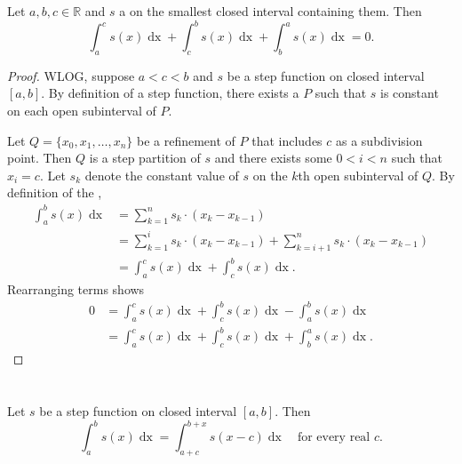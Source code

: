 \documentclass{report}
\begin{document}
\begin{theorem}[1.6]

  Let $a, b, c \in \mathbb{R}$ and $s$ a  on the
    smallest closed interval containing them.
  Then
    $$\int_a^c s(x) \mathop{dx} + \int_c^b s(x) \mathop{dx} +
      \int_b^a s(x) \mathop{dx} = 0.$$

\end{theorem}

\begin{proof}

  WLOG, suppose $a < c < b$ and $s$ be a step function on closed interval
    $[a, b]$.
  By definition of a step function, there exists a 
    $P$ such that $s$ is constant on each open subinterval of $P$.

  Let $Q = \{x_0, x_1, \ldots, x_n\}$ be a refinement of $P$ that includes $c$
    as a subdivision point.
  Then $Q$ is a step partition of $s$ and there exists some $0 < i < n$ such
    that $x_i = c$.
  Let $s_k$ denote the constant value of $s$ on the $k$th open subinterval of
    $Q$.
  By definition of the ,
    \begin{align*}
      \int_a^b s(x) \mathop{dx}
        & = \sum_{k=1}^n s_k \cdot (x_k - x_{k - 1}) \\
        & = \sum_{k=1}^i s_k \cdot (x_k - x_{k - 1}) +
            \sum_{k=i+1}^n s_k \cdot (x_k - x_{k - 1}) \\
        & = \int_a^c s(x) \mathop{dx} + \int_c^b s(x) \mathop{dx}.
    \end{align*}
  Rearranging terms shows
    \begin{align*}
      0
        & = \int_a^c s(x) \mathop{dx} + \int_c^b s(x) \mathop{dx} -
            \int_a^b s(x) \mathop{dx} \\
        & = \int_a^c s(x) \mathop{dx} + \int_c^b s(x) \mathop{dx} +
            \int_b^a s(x) \mathop{dx}.
    \end{align*}

\end{proof}

\section{}%
\label{sec:step-invariance-under-translation}
\label{sec:theorem-1.7}

\begin{theorem}[1.7]

  Let $s$ be a step function on closed interval $[a, b]$.
  Then
    $$\int_a^b s(x) \mathop{dx} =
      \int_{a+c}^{b+x} s(x - c) \mathop{dx} \quad\text{for every real } c.$$

\end{theorem}
\end{document}
